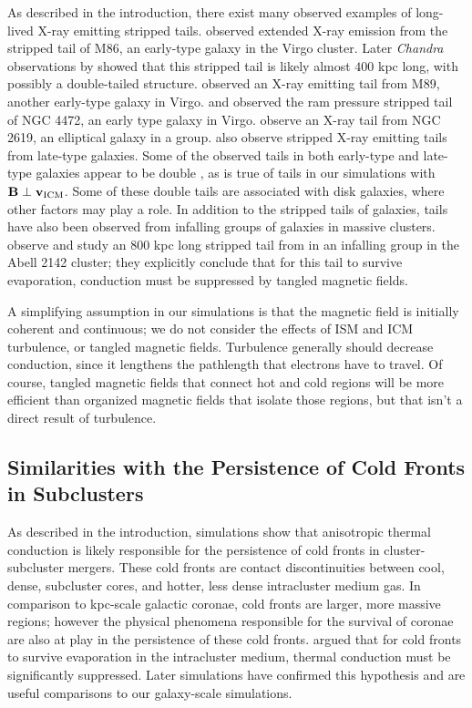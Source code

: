 \documentclass[twocolumn]{aastex6}
\begin{document}
As described in the introduction, there exist many observed examples of long-lived X-ray emitting stripped tails. \citet{Forman79} observed extended X-ray emission from the stripped tail of M86, an early-type galaxy in the Virgo cluster.  Later \textit{Chandra} observations by \citet{Randall08} showed that this stripped tail is likely almost $400$ kpc long, with possibly a double-tailed structure. \citet{Machacek06} observed an X-ray emitting tail from M89, another early-type galaxy in Virgo. \citet{Irwin96} and \citet{Kraft11} observed the ram pressure stripped tail of NGC 4472, an early type galaxy in Virgo.
\citet{Kim08} observe an X-ray tail from NGC 2619, an elliptical galaxy in a group.
\citet{Sun05b,Sun10,Zhang13} also observe stripped X-ray emitting tails from late-type galaxies. 
Some of the observed tails in both early-type and late-type galaxies appear to be double \citep[e.g.,][]{Randall08,Sun10}, as is true of tails in our simulations with $\mathbf{B} \perp \mathbf{v_{\rm ICM}}$. Some of these double tails are associated with disk galaxies, where other factors may play a role.
In addition to the stripped tails of galaxies, tails have also been observed from infalling groups of galaxies in massive clusters. \citet{Eckert14} observe and study an $800$  kpc long stripped tail from in an infalling group in the Abell 2142 cluster; they explicitly conclude that for this tail to survive evaporation, conduction must be suppressed by tangled magnetic fields.

A simplifying assumption in our simulations is that the magnetic field is initially coherent and continuous; we do not consider the effects of ISM and ICM turbulence, or tangled magnetic fields. Turbulence generally should decrease conduction, since it lengthens the pathlength that electrons have to travel.  Of course, tangled magnetic fields that connect hot and cold regions will be more efficient than organized  magnetic fields that isolate those regions, but that isn't a direct result of turbulence.

\subsection{Similarities with the Persistence of Cold Fronts in Subclusters}

As described in the introduction, simulations show that anisotropic thermal conduction is likely responsible for the persistence of cold fronts in cluster-subcluster mergers. These cold fronts are contact discontinuities between cool, dense, subcluster cores, and hotter, less dense intracluster medium gas. In comparison to kpc-scale galactic coronae, cold fronts are larger, more massive regions; however the physical phenomena responsible for the survival of coronae are also at play in the persistence of these cold fronts. \citet{Ettori00} argued that for cold fronts to survive evaporation in the intracluster medium, thermal conduction must be significantly suppressed. Later simulations have confirmed this hypothesis and are useful comparisons to our galaxy-scale simulations. 
\end{document}
